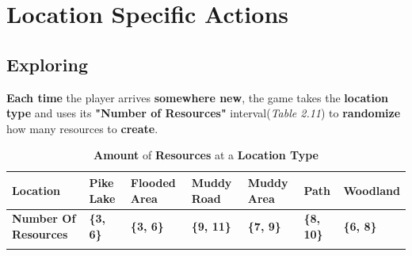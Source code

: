 	\section{Location Specific Actions}
		\subsection{Exploring}
			\par \textbf{Each time} the player arrives \textbf{somewhere new}, the game takes the \textbf{location type} and uses its \textbf{"Number of Resources"} interval(\textit{Table 2.11}) to \textbf{randomize} how many resources to \textbf{create}.
			\begin{longtable}{|C{7em}|C{4.3em}|C{4.3em}|C{4.3em}|C{4.3em}|C{3.7em}|C{5em}|}
			   \toprule
			    \textcolor[rgb]{ 1,  1,  1}{\textbf{Location}} & \textbf{Pike Lake} & \textbf{Flooded Area} & \textbf{Muddy Road} & \textbf{Muddy Area} & \textbf{Path} & \textbf{Woodland} \\
			   \midrule
			    \textcolor[rgb]{ 1,  1,  1}{\textbf{Number Of Resources}} & \textbf{\{3, 6\}} & \textbf{\{3, 6\}} & \textbf{\{9, 11\}} & \textbf{\{7, 9\}} & \textbf{\{8, 10\}} & \textbf{\{6, 8\}} \\
			   \bottomrule	
			\caption{\textbf{Amount} of \textbf{Resources} at a \textbf{Location Type}}
			\end{longtable}

